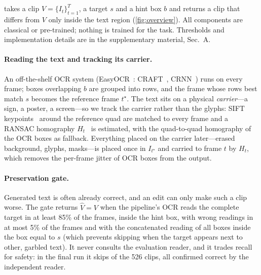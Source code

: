 \section{\method}
\label{sec:method}


\method takes a clip $V=\{I_t\}_{t=1}^{T}$, a target $s$ and a hint box $b$ and returns a clip that differs from $V$ only inside the text region (\cref{fig:overview}). All components are classical or pre-trained; nothing is trained for the task. Thresholds and implementation details are in the supplementary material, Sec.~A.

\paragraph{Reading the text and tracking its carrier.}
\label{sec:read}
An off-the-shelf OCR system (EasyOCR~\cite{easyocr}: CRAFT~\cite{baek2019craft}, CRNN~\cite{shi2017crnn}) runs on every frame; boxes overlapping $b$ are grouped into rows, and the frame whose rows best match $s$ becomes the reference frame $t^\star$. The text sits on a physical \emph{carrier}---a sign, a poster, a screen---so we track the carrier rather than the glyphs: SIFT keypoints~\cite{lowe2004sift} around the reference quad are matched to every frame and a RANSAC homography $H_t$~\cite{fischler1981ransac} is estimated, with the quad-to-quad homography of the OCR boxes as fallback. Everything placed on the carrier later---erased background, glyphs, masks---is placed once in $I_{t^\star}$ and carried to frame $t$ by $H_t$, which removes the per-frame jitter of OCR boxes from the output.

\paragraph{Preservation gate.}
\label{sec:pres}
Generated text is often already correct, and an edit can only make such a clip worse. The gate returns $\hat V=V$ when the pipeline's OCR reads the complete target in at least 85\% of the frames, inside the hint box, with wrong readings in at most 5\% of the frames and with the concatenated reading of all boxes inside the box equal to $s$ (which prevents skipping when the target appears next to other, garbled text). It never consults the evaluation reader, and it trades recall for safety: in the final run it skips \rSkipped{} of the 526 clips, all confirmed correct by the independent reader.

